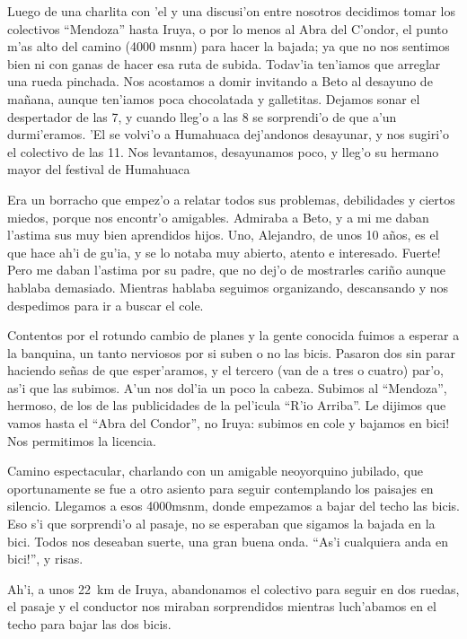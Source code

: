 Luego de una charlita con 'el y una discusi'on entre nosotros decidimos tomar
los colectivos ``Mendoza'' hasta Iruya, o por lo menos al Abra del C'ondor, el
punto m'as alto del camino (4000 msnm) para hacer la bajada; ya que no nos
sentimos bien ni con ganas de hacer esa ruta de subida. Todav'ia ten'iamos que
arreglar una rueda pinchada. Nos acostamos a domir invitando a Beto al desayuno
de ma\~nana, aunque ten'iamos poca chocolatada y galletitas. Dejamos sonar el
despertador de las 7, y cuando lleg'o a las 8 se sorprendi'o de que a'un
durmi'eramos. 'El se volvi'o a Humahuaca dej'andonos desayunar, y nos sugiri'o
el colectivo de las 11. Nos levantamos, desayunamos poco, y lleg'o su hermano
mayor del festival de Humahuaca

Era un borracho que empez'o a relatar todos sus problemas, debilidades y ciertos
miedos, porque nos encontr'o amigables. Admiraba a Beto, y a mi me daban
l'astima sus muy bien aprendidos hijos. Uno, Alejandro, de unos 10 a\~nos, es el
que hace ah'i de gu'ia, y se lo notaba muy abierto, atento e interesado.
\textexclamdown Fuerte! Pero me daban l'astima por su padre, que no dej'o de
mostrarles cari\~no aunque hablaba demasiado. Mientras hablaba
seguimos organizando, descansando y nos despedimos para ir a buscar el cole.

Contentos por el rotundo cambio de planes y la gente conocida fuimos a esperar a
la banquina, un tanto nerviosos por si suben o no las bicis. Pasaron dos sin
parar haciendo se\~nas de que esper'aramos, y el tercero (van de a tres o
cuatro) par'o, as'i que las subimos. A'un nos dol'ia un poco la cabeza. Subimos
al ``Mendoza'', hermoso, de los de las publicidades de la pel'icula ``R'io
Arriba''. Le dijimos que vamos hasta el ``Abra del Condor'', no Iruya:
\textexclamdown subimos en cole y bajamos en bici! Nos permitimos la licencia.

Camino espectacular, charlando con un amigable neoyorquino jubilado, que
oportunamente se fue a otro asiento para seguir contemplando los paisajes en
silencio. Llegamos a esos 4000msnm, donde empezamos a bajar del techo las bicis.
Eso s'i que sorprendi'o al pasaje, no se esperaban que sigamos la bajada en la
bici. Todos nos deseaban suerte, una gran buena onda. ``\textexclamdown As'i
cualquiera anda en bici!'', y risas.

Ah'i, a unos 22~km de Iruya, abandonamos el colectivo para seguir en dos ruedas,
el pasaje y el conductor nos miraban sorprendidos mientras luch'abamos en el
techo para bajar las dos bicis.

